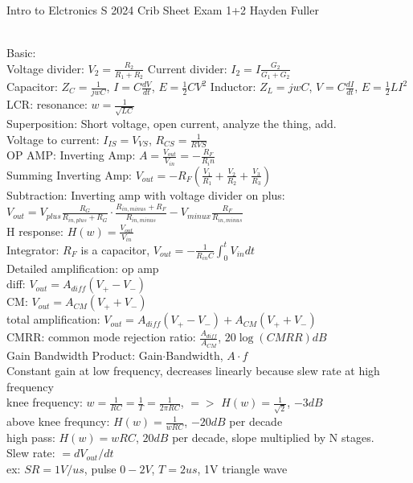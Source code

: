 \documentclass{article}
\begin{document}
Intro to Elctronics S 2024 Crib Sheet Exam 1+2 Hayden Fuller
\begin{large}
\\Basic:
\\Voltage divider: $V_2=\frac{R_2}{R_1+R_2}$ \hfill Current divider: $I_2=I\frac{G_2}{G_1+G_2}$
\\Capacitor: $Z_C=\frac{1}{jwC}$, $I=C\frac{dV}{dt}$, $E=\frac{1}{2}CV^2$ \hfill Inductor: $Z_L=jwC$, $V=C\frac{dI}{dt}$, $E=\frac{1}{2}LI^2$
\\LCR: resonance: $w=\frac{1}{\sqrt{LC}}$
\\Superposition: Short voltage, open current, analyze the thing, add.
\\Voltage to current: $I_{IS}=V_{VS}$, $R_{CS}=\frac{1}{R{VS}}$
\\OP AMP:      Inverting Amp: $A=\frac{V_{out}}{V_{in}}=-\frac{R_F}{R_in}$
\\Summing Inverting Amp: $V_{out}=-R_F(\frac{V_1}{R_1}+\frac{V_2}{R_2}+\frac{V_3}{R_3})$
\\Subtraction: Inverting amp with voltage divider on plus: $V_{out}=V_{plus}\frac{R_G}{R_{in,plus}+R_G}\cdot\frac{R_{in,minus}+R_F}{R_{in,minus}}-V_{minux}\frac{R_F}{R_{in,minus}}$
\\H response: $H(w)=\frac{V_{out}}{V_{in}}$
\\Integrator: $R_F$ is a capacitor, $V_{out}=-\frac{1}{R_{in}C}\int_0^tV_{in}dt$
\\Detailed amplification: op amp
\\diff: $V_{out}=A_{diff}(V_+-V_-)$
\\CM: $V_{out}=A_{CM}(V_++V_-)$
\\total amplification: $V_{out}=A_{diff}(V_+-V_-)+A_{CM}(V_++V_-)$
\\CMRR: common mode rejection ratio: $\frac{A_{diff}}{A_{CM}}$, $20\log(CMRR)dB$
\\Gain Bandwidth Product: Gain$\cdot$Bandwidth, $A\cdot f$
\\Constant gain at low frequency, decreases linearly because slew rate at high frequency
\\knee frequency: $w=\frac{1}{RC}=\frac{1}{T}=\frac{1}{2\pi RC}$, $=>$ $H(w)=\frac{1}{\sqrt{2}}$, $-3dB$
\\above knee frequncy: $H(w)=\frac{1}{wRC}$, $-20dB$ per decade
\\high pass: $H(w)=wRC$, $20dB$ per decade, slope multiplied by N stages.
\\Slew rate: $=dV_{out}/dt$
\\ex: $SR=1V/us$, pulse $0-2V$, $T=2us$,  1V triangle wave

\end{large}
\end{document}
